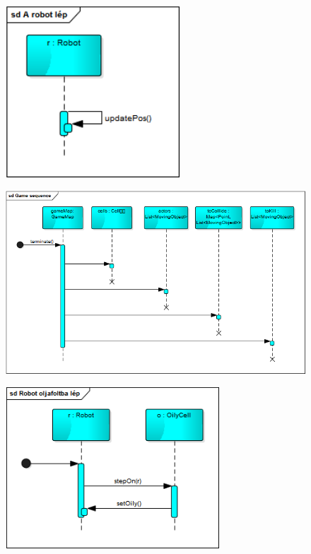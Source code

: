 \begin{figure}[!htbp]
	\begin{center}
		\includegraphics[width=65mm, center]{./chapters/chapter04/Arobotlep.png}
		\caption{}
	\end{center}
\end{figure}

\begin{figure}[!htbp]
	\begin{center}
		\includegraphics[width=180mm, center]{./chapters/chapter04/Gamesequence.png}
		\caption{}
	\end{center}
\end{figure}

\begin{figure}[!htbp]
	\begin{center}
		\includegraphics[width=80mm, center]{./chapters/chapter04/robotolajbalep.png}
		\caption{}
	\end{center}
\end{figure}

